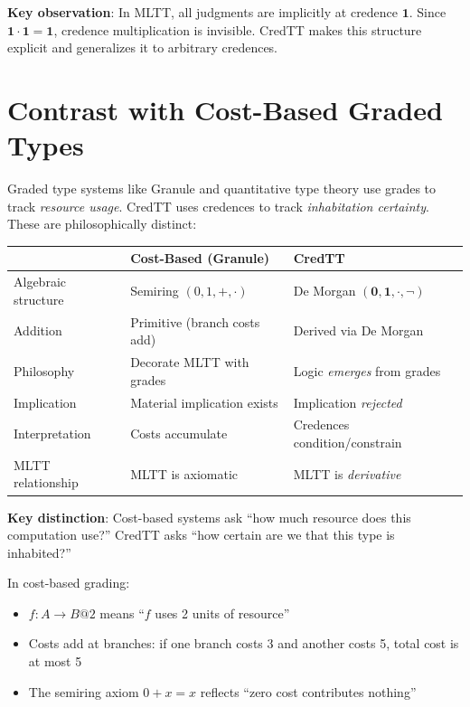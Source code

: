 \documentclass[11pt,a4paper]{article}
\newcommand{\one}{\mathbf{1}}
\newcommand{\zero}{\mathbf{0}}
\newcommand{\negc}{\neg}
\begin{document}
\textbf{Key observation}: In MLTT, all judgments are implicitly at credence $\one$. Since $\one \cdot \one = \one$, credence multiplication is invisible. CredTT makes this structure explicit and generalizes it to arbitrary credences.

\section{Contrast with Cost-Based Graded Types}

Graded type systems like Granule \citep{orchard2019quantitative} and quantitative type theory \citep{atkey2018syntax} use grades to track \emph{resource usage}. CredTT uses credences to track \emph{inhabitation certainty}. These are philosophically distinct:

\begin{center}
\begin{tabular}{l|l|l}
& \textbf{Cost-Based (Granule)} & \textbf{CredTT} \\
\hline
Algebraic structure & Semiring $(0, 1, +, \cdot)$ & De Morgan $(\zero, \one, \cdot, \negc)$ \\
Addition & Primitive (branch costs add) & Derived via De Morgan \\
Philosophy & Decorate MLTT with grades & Logic \emph{emerges} from grades \\
Implication & Material implication exists & Implication \emph{rejected} \\
Interpretation & Costs accumulate & Credences condition/constrain \\
MLTT relationship & MLTT is axiomatic & MLTT is \emph{derivative} \\
\end{tabular}
\end{center}

\textbf{Key distinction}: Cost-based systems ask ``how much resource does this computation use?'' CredTT asks ``how certain are we that this type is inhabited?''

In cost-based grading:
\begin{itemize}
    \item $f : A \to B @ 2$ means ``$f$ uses 2 units of resource''
    \item Costs add at branches: if one branch costs 3 and another costs 5, total cost is at most 5
    \item The semiring axiom $0 + x = x$ reflects ``zero cost contributes nothing''
\end{itemize}
\end{document}
